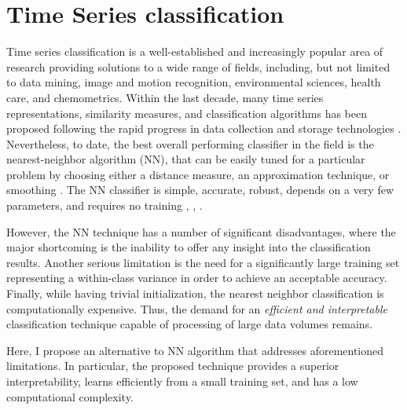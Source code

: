 \section{Time Series classification}
Time series classification is a well-established and increasingly popular area of research providing solutions to a wide 
range of fields, including, but not limited to data mining, image and motion recognition, environmental sciences, health care, 
and chemometrics. 
Within the last decade, many time series representations, similarity measures, and classification algorithms 
has been proposed following the rapid progress in data collection and storage technologies \cite{citeulike:10358271}. 
Nevertheless, to date, the best overall performing classifier in the field is the nearest-neighbor algorithm (NN), 
that can be easily tuned for a particular problem by choosing either a distance measure, an approximation technique, 
or smoothing \cite{citeulike:10358271}.
The NN classifier is simple, accurate, robust, depends on a very few parameters, and requires no training 
\cite{citeulike:10358271}, \cite{citeulike:532340}, \cite{citeulike:12563424}.

However, the NN technique has a number of significant disadvantages, where the major shortcoming is the 
inability to offer any insight into the classification results. 
Another serious limitation is the need for a significantly large training set representing a within-class 
variance in order to achieve an acceptable accuracy. 
Finally, while having trivial initialization, the nearest neighbor classification is computationally expensive. 
Thus, the demand for an \textit{efficient and interpretable} classification technique capable of processing of 
large data volumes remains.

Here, I propose an alternative to NN algorithm that addresses aforementioned limitations. 
In particular, the proposed technique provides a superior interpretability, learns efficiently from a small 
training set, and has a low computational complexity. 


